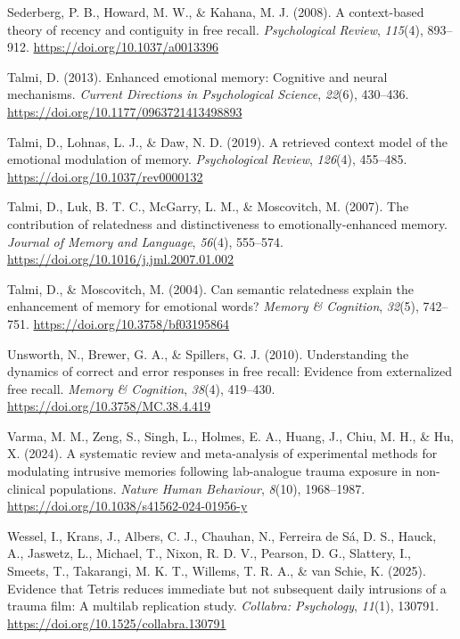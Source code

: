 \documentclass[
  man,
  floatsintext,
  longtable,
  nolmodern,
  notxfonts,
  notimes,
  draftfirst,
  colorlinks=true,linkcolor=blue,citecolor=blue,urlcolor=blue]{apa7}
\newlength{\cslhangindent}
\newenvironment{CSLReferences}[2] %
 {\begin{list}{}{%
  \setlength{\itemindent}{0pt}
  \setlength{\leftmargin}{0pt}
  \setlength{\parsep}{0pt}
  \ifodd #1
   \setlength{\leftmargin}{\cslhangindent}
   \setlength{\itemindent}{-1\cslhangindent}
  \fi
  \setlength{\itemsep}{#2\baselineskip}}}
 {\end{list}}
\begin{document}
\begin{CSLReferences}{1}{0}
Sederberg, P. B., Howard, M. W., \& Kahana, M. J. (2008). A
context-based theory of recency and contiguity in free recall.
\emph{Psychological Review}, \emph{115}(4), 893--912.
\url{https://doi.org/10.1037/a0013396}

Talmi, D. (2013). Enhanced emotional memory: Cognitive and neural
mechanisms. \emph{Current Directions in Psychological Science},
\emph{22}(6), 430--436. \url{https://doi.org/10.1177/0963721413498893}

Talmi, D., Lohnas, L. J., \& Daw, N. D. (2019). A retrieved context
model of the emotional modulation of memory. \emph{Psychological
Review}, \emph{126}(4), 455--485.
\url{https://doi.org/10.1037/rev0000132}

Talmi, D., Luk, B. T. C., McGarry, L. M., \& Moscovitch, M. (2007). The
contribution of relatedness and distinctiveness to emotionally-enhanced
memory. \emph{Journal of Memory and Language}, \emph{56}(4), 555--574.
\url{https://doi.org/10.1016/j.jml.2007.01.002}

Talmi, D., \& Moscovitch, M. (2004). Can semantic relatedness explain
the enhancement of memory for emotional words? \emph{Memory \&
Cognition}, \emph{32}(5), 742--751.
\url{https://doi.org/10.3758/bf03195864}

Unsworth, N., Brewer, G. A., \& Spillers, G. J. (2010). Understanding
the dynamics of correct and error responses in free recall: Evidence
from externalized free recall. \emph{Memory \& Cognition}, \emph{38}(4),
419--430. \url{https://doi.org/10.3758/MC.38.4.419}

Varma, M. M., Zeng, S., Singh, L., Holmes, E. A., Huang, J., Chiu, M.
H., \& Hu, X. (2024). A systematic review and meta-analysis of
experimental methods for modulating intrusive memories following
lab-analogue trauma exposure in non-clinical populations. \emph{Nature
Human Behaviour}, \emph{8}(10), 1968--1987.
\url{https://doi.org/10.1038/s41562-024-01956-y}

Wessel, I., Krans, J., Albers, C. J., Chauhan, N., Ferreira de Sá, D.
S., Hauck, A., Jaswetz, L., Michael, T., Nixon, R. D. V., Pearson, D.
G., Slattery, I., Smeets, T., Takarangi, M. K. T., Willems, T. R. A., \&
van Schie, K. (2025). Evidence that {Tetris} reduces immediate but not
subsequent daily intrusions of a trauma film: A multilab replication
study. \emph{Collabra: Psychology}, \emph{11}(1), 130791.
\url{https://doi.org/10.1525/collabra.130791}


\end{CSLReferences}
\end{document}
